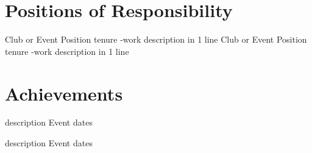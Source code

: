 \documentclass[a4paper,11pt]{article}
\begin{document}
\section{\textbf{Positions of Responsibility}}
\vspace{-0.4mm}
\resumeSubHeadingListStart
{} %
    {Club or Event} %
    {Position tenure} %
    -work description in 1 line
    {Club or Event} %
    {Position tenure} %
-work description in 1 line
    
\resumeSubHeadingListEnd
\vspace{-5mm}




\section{\textbf{Achievements}}
\vspace{-0.4mm}
\resumeSubHeadingListStart
{} %
    {description} %
    {Event dates} %
    
    {description} %
    {Event dates} %
\resumeSubHeadingListEnd
\vspace{-5mm}



\end{document}

